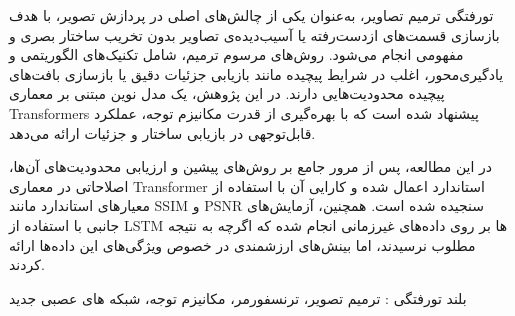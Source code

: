 


‌تورفتگی
ترمیم تصاویر، به‌عنوان یکی از چالش‌های اصلی در پردازش تصویر، با هدف بازسازی قسمت‌های از‌دست‌رفته یا آسیب‌دیده‌ی تصاویر بدون تخریب ساختار بصری و مفهومی انجام می‌شود. روش‌های مرسوم ترمیم، شامل تکنیک‌های الگوریتمی و یادگیری‌محور، اغلب در شرایط پیچیده مانند بازیابی جزئیات دقیق یا بازسازی بافت‌های پیچیده محدودیت‌هایی دارند. در این پژوهش، یک مدل نوین مبتنی بر معماری Transformers پیشنهاد شده است که با بهره‌گیری از قدرت مکانیزم توجه، عملکرد قابل‌توجهی در بازیابی ساختار و جزئیات ارائه می‌دهد.


در این مطالعه، پس از مرور جامع بر روش‌های پیشین و ارزیابی محدودیت‌های آن‌ها، اصلاحاتی در معماری Transformer استاندارد اعمال شده و کارایی آن با استفاده از معیارهای استاندارد مانند SSIM و PSNR سنجیده شده است. همچنین، آزمایش‌های جانبی با استفاده از LSTM‌ ها بر روی داده‌های غیرزمانی انجام شده که اگرچه به نتیجه مطلوب نرسیدند، اما بینش‌های ارزشمندی در خصوص ویژگی‌های این داده‌ها ارائه کردند. 


‌بلند
‌تورفتگی : 
ترمیم تصویر، ترنسفورمر، مکانیزم توجه، شبکه های عصبی
‌جدید
